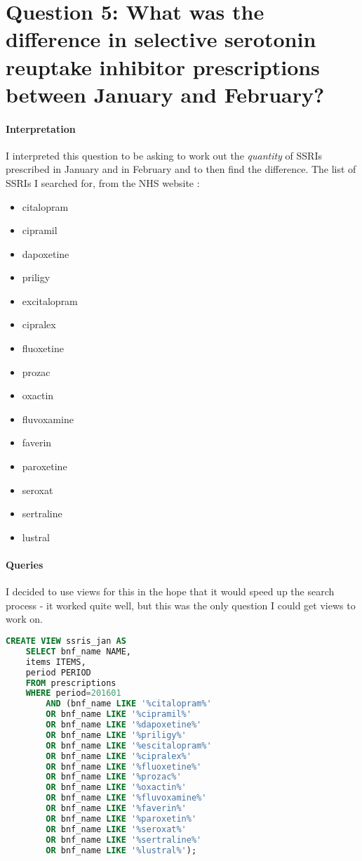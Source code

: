 \documentclass{report}
\begin{document}
\section{Question 5: What was the difference in selective serotonin reuptake inhibitor prescriptions between January and February?}
\paragraph{Interpretation}
I interpreted this question to be asking to work out the \textit{quantity} of SSRIs prescribed in January and in February and to then find the difference. The list of SSRIs I searched for, from the NHS website \cite{nhsssris}:
\begin{itemize}
\item citalopram
\item cipramil
\item dapoxetine
\item priligy
\item excitalopram
\item cipralex
\item fluoxetine
\item prozac
\item oxactin
\item fluvoxamine
\item faverin
\item paroxetine
\item seroxat
\item sertraline
\item lustral
\end{itemize}
\paragraph{Queries}
I decided to use views for this in the hope that it would speed up the search process - it worked quite well, but this was the only question I could get views to work on.
\begin{lstlisting}[language=SQL, caption=Question 5 - creating view for January SSRIs]
CREATE VIEW ssris_jan AS 
	SELECT bnf_name NAME, 
	items ITEMS, 
	period PERIOD 
	FROM prescriptions 
	WHERE period=201601 
		AND (bnf_name LIKE '%citalopram%' 
		OR bnf_name LIKE '%cipramil%' 
		OR bnf_name LIKE '%dapoxetine%' 
		OR bnf_name LIKE '%priligy%' 
		OR bnf_name LIKE '%escitalopram%' 
		OR bnf_name LIKE '%cipralex%' 
		OR bnf_name LIKE '%fluoxetine%' 
		OR bnf_name LIKE '%prozac%' 
		OR bnf_name LIKE '%oxactin%' 
		OR bnf_name LIKE '%fluvoxamine%' 
		OR bnf_name LIKE '%faverin%' 
		OR bnf_name LIKE '%paroxetin%' 
		OR bnf_name LIKE '%seroxat%' 
		OR bnf_name LIKE '%sertraline%' 
		OR bnf_name LIKE '%lustral%');
\end{lstlisting}
\end{document}
